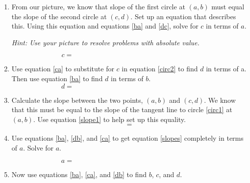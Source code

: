 \documentclass[11pt]{article}
\begin{document}
\begin{enumerate}
  \newpage

\item From our picture, we know that slope of the first circle at
  $(a,b)$ must equal the slope of the second circle at $(c,d)$.  Set
  up an equation that describes this.  Using this equation and
  equations \ref{ba} and \ref{dc}, solve for $c$ in terms of
  $a$. 

  \textit{Hint: Use your picture to resolve problems with absolute
    value.}
  
  
  \vfill
  
  \begin{equation}\label{ca}
    c = \hspace{3in}
  \end{equation}
  
  \newpage
  
\item Use equation \ref{ca} to substitute for $c$ in equation
  \ref{circ2} to find $d$ in terms of a.  Then use equation \ref{ba}
  to find $d$ in terms of $b$.
  \vfill
  \begin{equation}\label{db}
    d =\hspace{3in}
  \end{equation}
\item Calculate the slope between the two points, $(a,b)$ and
  $(c,d)$.  We know that this must be equal to the slope of the
  tangent line to circle \ref{circ1} at $(a,b)$.  Use equation
  \ref{slope1} to help set up this equality.
  \vfill
  \begin{equation}\label{slopes}
    =
  \end{equation}
  \newpage
  
\item Use equations \ref{ba}, \ref{db}, and \ref{ca} to get equation
  \ref{slopes} completely in terms of $a$.  Solve for $a$.
  
  \vfill
  
  \begin{equation}\label{a}
    a = \hspace{3in}
  \end{equation}
  
\item Now use equations \ref{ba}, \ref{ca}, and \ref{db} to find
  $b$, $c$, and $d$.
  
  \vfill
  
\end{enumerate}
\end{document}
